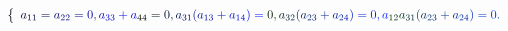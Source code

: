 \documentclass[12pt]{article}
\begin{document}
\makeatletter
\renewcommand*{\@textcolor}[3]{%
  \protect\leavevmode
  \begingroup
    \color#1{#2}#3%
  \endgroup
}
\makeatother
\begin{displaymath}
\mathcolor[RGB]{0,0,15}{\left\{} \begin{array} {c} \mathcolor[RGB]{0,0,30}{\textstyle} { \mathcolor[RGB]{0,0,45}{a} _ { \mathcolor[RGB]{0,0,60}{1} \mathcolor[RGB]{0,0,75}{1} } \mathcolor[RGB]{0,0,90}{=} \mathcolor[RGB]{0,0,105}{a} _ { \mathcolor[RGB]{0,0,120}{2} \mathcolor[RGB]{0,0,135}{2} } \mathcolor[RGB]{0,0,150}{=} \mathcolor[RGB]{0,0,165}{0} \mathcolor[RGB]{0,0,180}{,} \mathcolor[RGB]{0,0,195}{a} _ { \mathcolor[RGB]{0,0,210}{3} \mathcolor[RGB]{0,0,225}{3} } \mathcolor[RGB]{0,0,240}{+} \mathcolor[RGB]{0,0,255}{a} _ { \mathcolor[RGB]{0,15,0}{4} \mathcolor[RGB]{0,15,15}{4} } \mathcolor[RGB]{0,15,30}{=} \mathcolor[RGB]{0,15,45}{0} \mathcolor[RGB]{0,15,60}{,} \mathcolor[RGB]{0,15,75}{a} _ { \mathcolor[RGB]{0,15,90}{3} \mathcolor[RGB]{0,15,105}{1} } \mathcolor[RGB]{0,15,120}{(} \mathcolor[RGB]{0,15,135}{a} _ { \mathcolor[RGB]{0,15,150}{1} \mathcolor[RGB]{0,15,165}{3} } \mathcolor[RGB]{0,15,180}{+} \mathcolor[RGB]{0,15,195}{a} _ { \mathcolor[RGB]{0,15,210}{1} \mathcolor[RGB]{0,15,225}{4} } \mathcolor[RGB]{0,15,240}{)} \mathcolor[RGB]{0,15,255}{=} \mathcolor[RGB]{0,30,0}{0} \mathcolor[RGB]{0,30,15}{,} \mathcolor[RGB]{0,30,30}{a} _ { \mathcolor[RGB]{0,30,45}{3} \mathcolor[RGB]{0,30,60}{2} } \mathcolor[RGB]{0,30,75}{(} \mathcolor[RGB]{0,30,90}{a} _ { \mathcolor[RGB]{0,30,105}{2} \mathcolor[RGB]{0,30,120}{3} } \mathcolor[RGB]{0,30,135}{+} \mathcolor[RGB]{0,30,150}{a} _ { \mathcolor[RGB]{0,30,165}{2} \mathcolor[RGB]{0,30,180}{4} } \mathcolor[RGB]{0,30,195}{)} \mathcolor[RGB]{0,30,210}{=} \mathcolor[RGB]{0,30,225}{0} \mathcolor[RGB]{0,30,240}{,} \mathcolor[RGB]{0,30,255}{a} _ { \mathcolor[RGB]{0,45,0}{1} \mathcolor[RGB]{0,45,15}{2} } \mathcolor[RGB]{0,45,30}{a} _ { \mathcolor[RGB]{0,45,45}{3} \mathcolor[RGB]{0,45,60}{1} } \mathcolor[RGB]{0,45,75}{(} \mathcolor[RGB]{0,45,90}{a} _ { \mathcolor[RGB]{0,45,105}{2} \mathcolor[RGB]{0,45,120}{3} } \mathcolor[RGB]{0,45,135}{+} \mathcolor[RGB]{0,45,150}{a} _ { \mathcolor[RGB]{0,45,165}{2} \mathcolor[RGB]{0,45,180}{4} } \mathcolor[RGB]{0,45,195}{)} \mathcolor[RGB]{0,45,210}{=} \mathcolor[RGB]{0,45,225}{0} \mathcolor[RGB]{0,45,240}{.} } \end{array} \mathcolor[RGB]{0,45,255}{\right.}
\end{displaymath}
\end{document}
